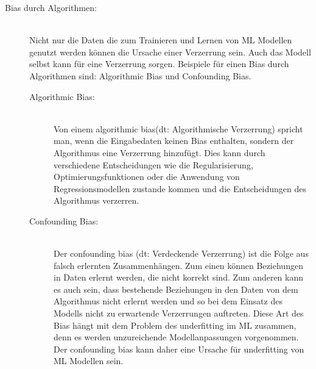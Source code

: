 \begin{onehalfspace}
\begin{description}
            \item [Bias durch Algorithmen:] \hfill \\
            Nicht nur die Daten die zum Trainieren und Lernen von \ac*{ML} Modellen genutzt werden können die Ursache einer Verzerrung sein. Auch das Modell selbst kann für eine Verzerrung sorgen. Beispiele für einen Bias durch Algorithmen sind: Algorithmic Bias und Confounding Bias.
            \begin{description}
                \item [Algorithmic Bias:] \hfill \\
                Von einem \glqq{}algorithmic bias\grqq{}(\ac*{dt}: Algorithmische Verzerrung) spricht man, wenn die Eingabedaten keinen Bias enthalten, sondern der Algorithmus eine Verzerrung hinzufügt. Dies kann durch verschiedene Entscheidungen wie die Regularisierung, Optimierungsfunktionen oder die Anwendung von Regressionsmodellen zustande kommen und die Entscheidungen des Algorithmus verzerren.\cite{srinivasan2021biases}\cite{Mehrabi2021}
                \item [Confounding Bias:] \hfill \\
                Der \glqq{}confounding bias\grqq{} (\ac*{dt}: Verdeckende Verzerrung) ist die Folge aus falsch erlernten Zusammenhängen. Zum einen können Beziehungen in Daten erlernt werden, die nicht korrekt sind. Zum anderen kann es auch sein, dass bestehende Beziehungen in den Daten von dem Algorithmus nicht erlernt werden und so bei dem Einsatz des Modells nicht zu erwartende Verzerrungen auftreten. Diese Art des Bias hängt mit dem Problem des underfitting im \ac*{ML} zusammen, denn es werden unzureichende Modellanpassungen vorgenommen. Der confounding bias kann daher eine Ursache für underfitting von \ac*{ML} Modellen sein.\cite{srinivasan2021biases}
            \end{description}
                

\end{description}
\end{onehalfspace}
